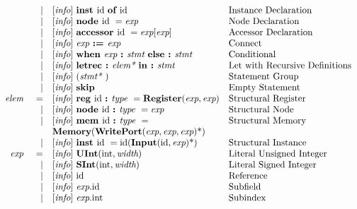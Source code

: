 \documentclass[12pt]{article}
\begin{document}
\[\begin{array}{rrll}
                &\vert &[\text{\em info}]\  \text{\bf inst\ } \text{id } \text{\bf of\ } \text{id }                                               &\text{Instance Declaration}\\
                &\vert &[\text{\em info}]\  \text{\bf node\ } \text{id }  = \text{\em exp\ }                               &\text{Node Declaration}\\
                &\vert &[\text{\em info}]\  \text{\bf accessor\ } \text{id } = \text{\em exp}[\text{\em exp}]                                &\text{Accessor Declaration}\\
                &\vert &[\text{\em info}]\  \text{\em exp\ } \text{\bf :=\ } \text{\em exp\ }                                               &\text{Connect}\\
                &\vert &[\text{\em info}]\  \text{\bf when\ } \text{\em exp\ } \text{\bf :\ } \text{\em stmt\ } \text{\bf else :\ } \text{\em stmt\ }               &\text{Conditional}\\
                &\vert &[\text{\em info}]\  \text{\bf letrec :\ } \text{\em elem*\ } \text{\bf in :\ } \text{\em stmt\ }                            &\text{Let with Recursive Definitions}\\
                &\vert &[\text{\em info}]\  (\text{\em stmt*\ })                                                            &\text{Statement Group}\\
                &\vert &[\text{\em info}]\  \text{\bf skip\ }                                                               &\text{Empty Statement}\\
\text{\em elem\ }       &=     &[\text{\em info}]\  \text{\bf reg\ } \text{id } \text{\bf :\ } \text{\em type\ } = \text{\bf Register}(\text{\em exp}, \text{\em exp})    &\text{Structural Register}\\
                &\vert &[\text{\em info}]\  \text{\bf node\ } \text{id } \text{\bf :\ } \text{\em type\ } = \text{\em exp\ }                               &\text{Structural Node}\\
                &\vert &[\text{\em info}]\  \text{\bf mem\ } \text{id } \text{\bf :\ } \text{\em type\ } =                                         &\text{Structural Memory}\\
                &      &\text{\bf Memory}(\text{\bf WritePort}(\text{\em exp}, \text{\em exp}, \text{\em exp})\text{*})  &\\
                &\vert &[\text{\em info}]\  \text{\bf inst\ } \text{id } = \text{id}(\text{\bf Input}(\text{id},\text{\em exp})\text{*})               &\text{Structural Instance}\\
\text{\em exp\ }        &=     &[\text{\em info}]\  \text{\bf UInt}(\text{int}, \text{\em width})                                          &\text{Literal Unsigned Integer}\\
                &\vert &[\text{\em info}]\  \text{\bf SInt}(\text{int}, \text{\em width})                                          &\text{Literal Signed Integer}\\
                &\vert &[\text{\em info}]\  \text{id }                                                                     &\text{Reference}\\
                &\vert &[\text{\em info}]\  \text{\em exp}.\text{id }                                                           &\text{Subfield}\\
                &\vert &[\text{\em info}]\  \text{\em exp}.\text{int}                                                         &\text{Subindex}\\
\end{array}
\]
\end{document}
